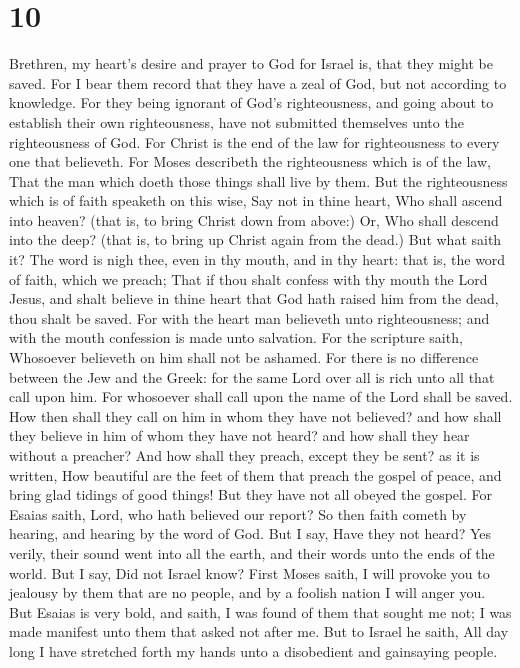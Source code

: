 \hypertarget{section-9}{%
\section{10}\label{section-9}}

 Brethren, my heart's desire and prayer to God for Israel
is, that they might be saved.  For I bear them record that
they have a zeal of God, but not according to knowledge. 
For they being ignorant of God's righteousness, and going about to
establish their own righteousness, have not submitted themselves unto
the righteousness of God.  For Christ is the end of the
law for righteousness to every one that believeth.  For
Moses describeth the righteousness which is of the law, That the man
which doeth those things shall live by them.  But the
righteousness which is of faith speaketh on this wise, Say not in thine
heart, Who shall ascend into heaven? (that is, to bring Christ down from
above:)  Or, Who shall descend into the deep? (that is, to
bring up Christ again from the dead.)  But what saith it?
The word is nigh thee, even in thy mouth, and in thy heart: that is, the
word of faith, which we preach;  That if thou shalt
confess with thy mouth the Lord Jesus, and shalt believe in thine heart
that God hath raised him from the dead, thou shalt be saved.
 For with the heart man believeth unto righteousness; and
with the mouth confession is made unto salvation.  For
the scripture saith, Whosoever believeth on him shall not be ashamed.
 For there is no difference between the Jew and the
Greek: for the same Lord over all is rich unto all that call upon him.
 For whosoever shall call upon the name of the Lord shall
be saved.  How then shall they call on him in whom they
have not believed? and how shall they believe in him of whom they have
not heard? and how shall they hear without a preacher? 
And how shall they preach, except they be sent? as it is written, How
beautiful are the feet of them that preach the gospel of peace, and
bring glad tidings of good things!  But they have not all
obeyed the gospel. For Esaias saith, Lord, who hath believed our report?
 So then faith cometh by hearing, and hearing by the word
of God.  But I say, Have they not heard? Yes verily,
their sound went into all the earth, and their words unto the ends of
the world.  But I say, Did not Israel know? First Moses
saith, I will provoke you to jealousy by them that are no people, and by
a foolish nation I will anger you.  But Esaias is very
bold, and saith, I was found of them that sought me not; I was made
manifest unto them that asked not after me.  But to
Israel he saith, All day long I have stretched forth my hands unto a
disobedient and gainsaying people.

